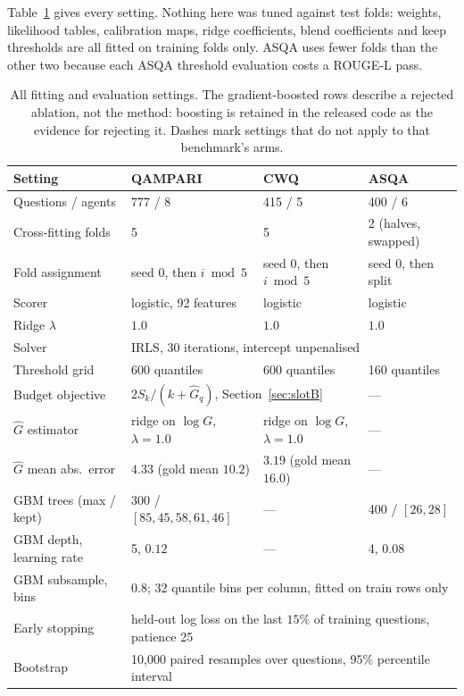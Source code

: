 \documentclass[11pt]{article}
\begin{document}
Table~\ref{tab:hyper} gives every setting. Nothing here was tuned against test folds: weights, likelihood tables, calibration maps, ridge coefficients, blend coefficients and keep thresholds are all fitted on training folds only. ASQA uses fewer folds than the other two because each ASQA threshold evaluation costs a ROUGE-L pass.

\begin{table}[t]
  \caption{All fitting and evaluation settings. The gradient-boosted rows describe a rejected ablation, not the method: boosting is retained in the released code as the evidence for rejecting it. Dashes mark settings that do not apply to that benchmark's arms.}
  \label{tab:hyper}
  \centering
  \begin{tabular}{llll}
    \toprule
    Setting & QAMPARI & CWQ & ASQA \\
    \midrule
    Questions / agents          & 777 / 8 & 415 / 5 & 400 / 6 \\
    Cross-fitting folds         & 5 & 5 & 2 (halves, swapped) \\
    Fold assignment             & seed 0, then $i \bmod 5$ & seed 0, then $i \bmod 5$ & seed 0, then split \\
    \midrule
    Scorer                      & logistic, 92 features & logistic & logistic \\
    Ridge $\lambda$             & $1.0$ & $1.0$ & $1.0$ \\
    Solver                      & \multicolumn{3}{l}{IRLS, 30 iterations, intercept unpenalised} \\
    Threshold grid              & 600 quantiles & 600 quantiles & 160 quantiles \\
    \midrule
    Budget objective            & \multicolumn{2}{l}{$2S_k / (k + \hat{G}_q)$, Section~\ref{sec:slotB}} & --- \\
    $\hat{G}$ estimator         & ridge on $\log G$, $\lambda = 1.0$ & ridge on $\log G$, $\lambda = 1.0$ & --- \\
    $\hat{G}$ mean abs.\ error  & $4.33$ (gold mean $10.2$) & $3.19$ (gold mean $16.0$) & --- \\
    \midrule
    GBM trees (max / kept)      & 300 / $[85, 45, 58, 61, 46]$ & --- & 400 / $[26, 28]$ \\
    GBM depth, learning rate    & 5, $0.12$ & --- & 4, $0.08$ \\
    GBM subsample, bins         & \multicolumn{3}{l}{$0.8$; 32 quantile bins per column, fitted on train rows only} \\
    Early stopping              & \multicolumn{3}{l}{held-out log loss on the last $15\%$ of training questions, patience 25} \\
    \midrule
    Bootstrap                   & \multicolumn{3}{l}{10,000 paired resamples over questions, $95\%$ percentile interval} \\
    \bottomrule
  \end{tabular}
\end{table}
\end{document}
